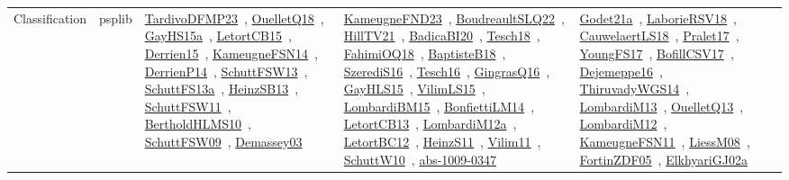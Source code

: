 {\begin{longtable}{lp{3cm}>{\raggedright\arraybackslash}p{6cm}>{\raggedright\arraybackslash}p{6cm}>{\raggedright\arraybackslash}p{8cm}}
Classification & psplib & \href{works/TardivoDFMP23.pdf}{TardivoDFMP23}~\cite{TardivoDFMP23}, \href{works/OuelletQ18.pdf}{OuelletQ18}~\cite{OuelletQ18}, \href{works/GayHS15a.pdf}{GayHS15a}~\cite{GayHS15a}, \href{works/LetortCB15.pdf}{LetortCB15}~\cite{LetortCB15}, \href{works/Derrien15.pdf}{Derrien15}~\cite{Derrien15}, \href{works/KameugneFSN14.pdf}{KameugneFSN14}~\cite{KameugneFSN14}, \href{works/DerrienP14.pdf}{DerrienP14}~\cite{DerrienP14}, \href{works/SchuttFSW13.pdf}{SchuttFSW13}~\cite{SchuttFSW13}, \href{works/SchuttFS13a.pdf}{SchuttFS13a}~\cite{SchuttFS13a}, \href{works/HeinzSB13.pdf}{HeinzSB13}~\cite{HeinzSB13}, \href{works/SchuttFSW11.pdf}{SchuttFSW11}~\cite{SchuttFSW11}, \href{works/BertholdHLMS10.pdf}{BertholdHLMS10}~\cite{BertholdHLMS10}, \href{works/SchuttFSW09.pdf}{SchuttFSW09}~\cite{SchuttFSW09}, \href{works/Demassey03.pdf}{Demassey03}~\cite{Demassey03} & \href{works/KameugneFND23.pdf}{KameugneFND23}~\cite{KameugneFND23}, \href{works/BoudreaultSLQ22.pdf}{BoudreaultSLQ22}~\cite{BoudreaultSLQ22}, \href{works/HillTV21.pdf}{HillTV21}~\cite{HillTV21}, \href{works/BadicaBI20.pdf}{BadicaBI20}~\cite{BadicaBI20}, \href{works/Tesch18.pdf}{Tesch18}~\cite{Tesch18}, \href{works/FahimiOQ18.pdf}{FahimiOQ18}~\cite{FahimiOQ18}, \href{works/BaptisteB18.pdf}{BaptisteB18}~\cite{BaptisteB18}, \href{works/SzerediS16.pdf}{SzerediS16}~\cite{SzerediS16}, \href{works/Tesch16.pdf}{Tesch16}~\cite{Tesch16}, \href{works/GingrasQ16.pdf}{GingrasQ16}~\cite{GingrasQ16}, \href{works/GayHLS15.pdf}{GayHLS15}~\cite{GayHLS15}, \href{works/VilimLS15.pdf}{VilimLS15}~\cite{VilimLS15}, \href{works/LombardiBM15.pdf}{LombardiBM15}~\cite{LombardiBM15}, \href{works/BonfiettiLM14.pdf}{BonfiettiLM14}~\cite{BonfiettiLM14}, \href{works/LetortCB13.pdf}{LetortCB13}~\cite{LetortCB13}, \href{works/LombardiM12a.pdf}{LombardiM12a}~\cite{LombardiM12a}, \href{works/LetortBC12.pdf}{LetortBC12}~\cite{LetortBC12}, \href{works/HeinzS11.pdf}{HeinzS11}~\cite{HeinzS11}, \href{works/Vilim11.pdf}{Vilim11}~\cite{Vilim11}, \href{works/SchuttW10.pdf}{SchuttW10}~\cite{SchuttW10}, \href{works/abs-1009-0347.pdf}{abs-1009-0347}~\cite{abs-1009-0347} & \href{works/Godet21a.pdf}{Godet21a}~\cite{Godet21a}, \href{works/LaborieRSV18.pdf}{LaborieRSV18}~\cite{LaborieRSV18}, \href{works/CauwelaertLS18.pdf}{CauwelaertLS18}~\cite{CauwelaertLS18}, \href{works/Pralet17.pdf}{Pralet17}~\cite{Pralet17}, \href{works/YoungFS17.pdf}{YoungFS17}~\cite{YoungFS17}, \href{works/BofillCSV17.pdf}{BofillCSV17}~\cite{BofillCSV17}, \href{works/Dejemeppe16.pdf}{Dejemeppe16}~\cite{Dejemeppe16}, \href{works/ThiruvadyWGS14.pdf}{ThiruvadyWGS14}~\cite{ThiruvadyWGS14}, \href{works/LombardiM13.pdf}{LombardiM13}~\cite{LombardiM13}, \href{works/OuelletQ13.pdf}{OuelletQ13}~\cite{OuelletQ13}, \href{works/LombardiM12.pdf}{LombardiM12}~\cite{LombardiM12}, \href{works/KameugneFSN11.pdf}{KameugneFSN11}~\cite{KameugneFSN11}, \href{works/LiessM08.pdf}{LiessM08}~\cite{LiessM08}, \href{works/FortinZDF05.pdf}{FortinZDF05}~\cite{FortinZDF05}, \href{works/ElkhyariGJ02a.pdf}{ElkhyariGJ02a}~\cite{ElkhyariGJ02a}\\

\end{longtable}}
